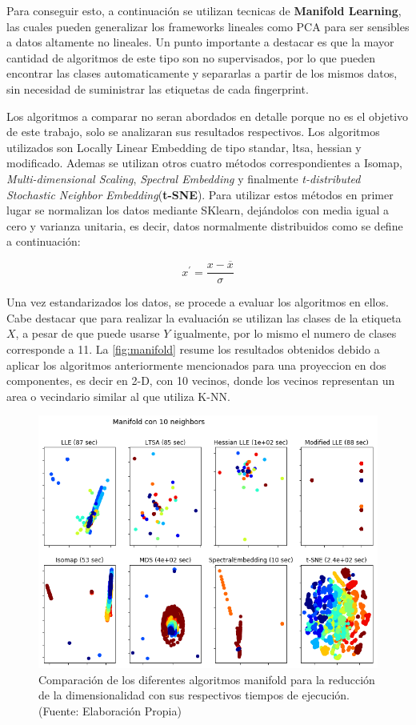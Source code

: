 Para conseguir esto, a continuación se utilizan tecnicas de \textbf{Manifold Learning}, las cuales pueden generalizar los frameworks lineales como PCA para ser sensibles a datos altamente no lineales. Un punto importante a destacar es que la mayor cantidad de algoritmos de este tipo son no supervisados, por lo que pueden encontrar las clases automaticamente y separarlas a partir de los mismos datos, sin necesidad de suministrar las etiquetas de cada fingerprint.

Los algoritmos a comparar no seran abordados en detalle porque no es el objetivo de este trabajo, solo se analizaran sus resultados respectivos. Los algoritmos utilizados son Locally Linear Embedding de tipo standar, ltsa, hessian y modificado. Ademas se utilizan otros cuatro métodos correspondientes a Isomap, \textit{Multi-dimensional Scaling}, \textit{Spectral Embedding} y finalmente \textit{t-distributed Stochastic Neighbor Embedding}(\textbf{t-SNE}). Para utilizar estos métodos en primer lugar se normalizan los datos mediante SKlearn, dejándolos con media igual a cero y varianza unitaria, es decir, datos normalmente distribuidos como se define a continuación:

$$ x^{'} = \frac{x- \overline{x}}{\sigma}$$

Una vez estandarizados los datos, se procede a evaluar los algoritmos en ellos. Cabe destacar que para realizar la evaluación se utilizan las clases de la etiqueta $X$, a pesar de que puede usarse $Y$ igualmente, por lo mismo el numero de clases corresponde a 11. La \autoref{fig:manifold} resume los resultados obtenidos debido a aplicar los algoritmos anteriormente mencionados para una proyeccion en dos componentes, es decir en 2-D, con 10 vecinos, donde los vecinos representan un area o vecindario similar al que utiliza K-NN.

\begin{figure}[ht!]
\centering
\includegraphics[width=.6\textwidth]{figures/manifold.png}
\caption[abs]{Comparación de los diferentes algoritmos manifold para la reducción de la dimensionalidad con sus respectivos tiempos de ejecución. \\
{\scriptsize (Fuente: Elaboración Propia)}}
\label{fig:manifold}
\end{figure}


